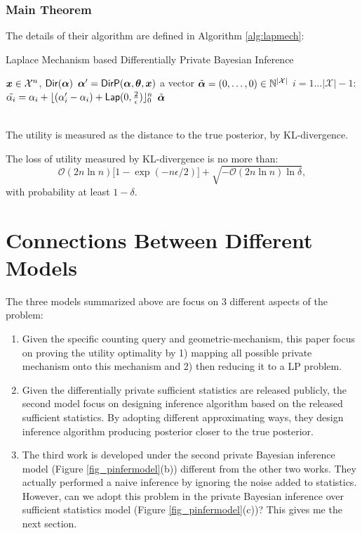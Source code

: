 \documentclass{article}
\begin{document}
\subsubsection{Main Theorem}
The details of their algorithm are defined in Algorithm \ref{alg:lapmech}:
%
\begin{algorithm}
  \caption{Laplace Mechanism based Differentially Private Bayesian Inference}
  \label{alg:lapmech}
  \begin{algorithmic}
  \STATE $\boldsymbol{x}\in\mathcal{X}^n$, $\mathsf{Dir}(\boldsymbol{\alpha})$
  \STATE {} $\boldsymbol{\alpha}' = \mathsf{DirP}(\boldsymbol{\alpha},\boldsymbol{\theta},\boldsymbol{x})$
  \STATE {} a vector $\tilde{\boldsymbol{\alpha}} = (0, \dots, 0 )\in \mathbb{N}^{|\mathcal{X}|}$ 
  \STATE {} $i = 1 \dots |\mathcal{X}| - 1$:
  \STATE \quad {} $\tilde{\alpha_i}=\alpha_i + \lfloor{(\alpha_i' - \alpha_i)+ \mathsf{Lap}(0, \frac{2}{\epsilon}) }\rfloor^n_0$
   $\tilde{\boldsymbol{\alpha}}$
  \end{algorithmic}
\end{algorithm}
%
\\
The utility is measured as the distance to the true posterior, by KL-divergence. 
\begin{thm}
The loss of utility measured by KL-divergence is no more than:
\[
	\mathcal{O}(2n\ln n)\big[ 1 - \exp(-n\epsilon / 2) \big] + \sqrt{-\mathcal{O}(2 n \ln n) \ln \delta},
\]
with probability at least $1 - \delta$.
\end{thm}
%
%
\section{Connections Between Different Models}
The three models summarized above are focus on 3 different aspects of the problem:
\begin{enumerate} 
\item Given the specific counting query and geometric-mechanism, this paper focus on proving the utility optimality by 
1) mapping all possible private mechanism onto this mechanism and 2) then reducing it to a LP problem.
%
\item Given the differentially private sufficient statistics are released publicly, 
the second model focus on designing inference algorithm based on the released sufficient statistics. 
By adopting different approximating ways, they design inference algorithm producing posterior closer to the true posterior.
%
\item The third work is developed under the second private Bayesian inference model (Figure \ref{fig_pinfermodel}(b)) different from the other two works.
They actually performed a naive inference by ignoring the noise added to statistics.
However, can we adopt this problem in the private Bayesian inference over sufficient statistics model (Figure \ref{fig_pinfermodel}(c))?
This gives me the next section.
\end{enumerate}
\end{document}
